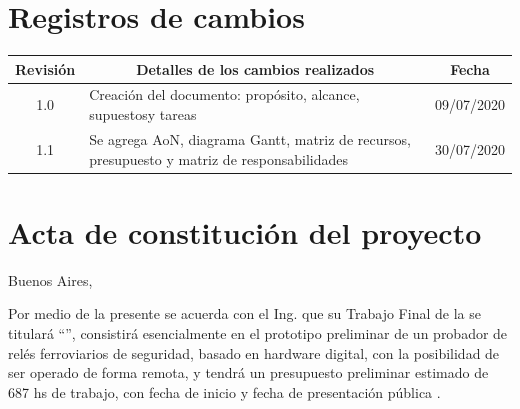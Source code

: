 \documentclass[11pt]{charter}
\begin{document}
\maketitle
\thispagestyle{empty}
\pagebreak


\thispagestyle{empty}
{\setlength{\parskip}{0pt}
\tableofcontents{}
}
\pagebreak


\section{Registros de cambios}
\label{sec:registro}


\begin{table}[ht]
\label{tab:registro}
\centering

\begin{tabularx}{\linewidth}{@{}|c|X|c|@{}}
\hline
\rowcolor[HTML]{C0C0C0} 
Revisión & \multicolumn{1}{c|}{\cellcolor[HTML]{C0C0C0}Detalles de los cambios realizados} & Fecha      \\ \hline
1.0      & Creación del documento: propósito, alcance, supuestos\newline                                                        y tareas & 09/07/2020 \\ \hline
1.1      & Se agrega AoN, diagrama Gantt, matriz de recursos,\newline
presupuesto y matriz de responsabilidades & 30/07/2020 \\ \hline
\end{tabularx}
\end{table}

\pagebreak



\section{Acta de constitución del proyecto}
\label{sec:acta}

\begin{flushright}
Buenos Aires, \fechaInicioName
\end{flushright}

\vspace{2cm}

Por medio de la presente se acuerda con el Ing. \authorname\hspace{1px} que su Trabajo Final de la \degreename\hspace{1px} se titulará ``\ttitle'', consistirá esencialmente en el prototipo preliminar de un probador de relés ferroviarios de seguridad, basado en hardware digital, con la posibilidad de ser operado de forma remota, y tendrá un presupuesto preliminar estimado de 687 hs de trabajo, con fecha de inicio \fechaInicioName\hspace{1px} y fecha de presentación pública \fechaFinalName.
\end{document}
